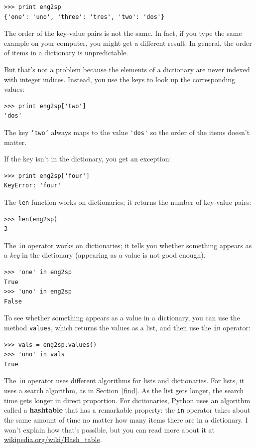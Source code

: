 \documentclass[10pt]{book}
\begin{document}
\beforeverb
\begin{verbatim}
>>> print eng2sp
{'one': 'uno', 'three': 'tres', 'two': 'dos'}
\end{verbatim}
\afterverb
%
The order of the key-value pairs is not the same.  In fact, if
you type the same example on your computer, you might get a
different result.  In general, the order of items in
a dictionary is unpredictable.

But that's not a problem because
the elements of a dictionary are never indexed with integer indices.
Instead, you use the keys to look up the corresponding values:

\beforeverb
\begin{verbatim}
>>> print eng2sp['two']
'dos'
\end{verbatim}
\afterverb
%
The key {\tt 'two'} always maps to the value \verb"'dos'" so the order
of the items doesn't matter.

If the key isn't in the dictionary, you get an exception:


\beforeverb
\begin{verbatim}
>>> print eng2sp['four']
KeyError: 'four'
\end{verbatim}
\afterverb
%
The {\tt len} function works on dictionaries; it returns the
number of key-value pairs:


\beforeverb
\begin{verbatim}
>>> len(eng2sp)
3
\end{verbatim}
\afterverb
%
The {\tt in} operator works on dictionaries; it tells you whether
something appears as a {\em key} in the dictionary (appearing
as a value is not good enough).


\beforeverb
\begin{verbatim}
>>> 'one' in eng2sp
True
>>> 'uno' in eng2sp
False
\end{verbatim}
\afterverb
%
To see whether something appears as a value in a dictionary, you
can use the method {\tt values}, which returns the values as
a list, and then use the {\tt in} operator:


\beforeverb
\begin{verbatim}
>>> vals = eng2sp.values()
>>> 'uno' in vals
True
\end{verbatim}
\afterverb
%
The {\tt in} operator uses different algorithms for lists and
dictionaries.  For lists, it uses a search algorithm, as in
Section~\ref{find}.  As the list gets longer, the search time gets
longer in direct proportion.  For dictionaries, Python uses an
algorithm called a {\bf hashtable} that has a remarkable property: the
{\tt in} operator takes about the same amount of time no matter how
many items there are in a dictionary.  I won't explain how that's
possible, but you can read more about it at
\url{wikipedia.org/wiki/Hash_table}.
\end{document}
